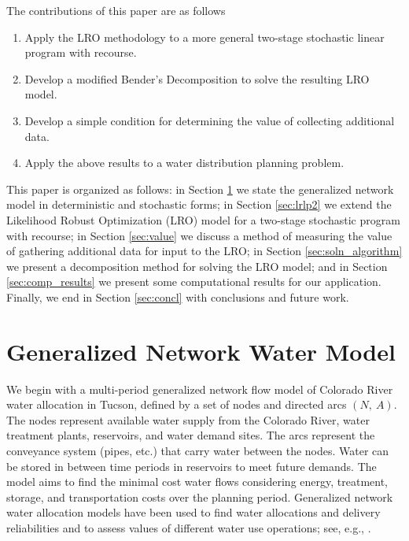 \documentclass[11pt]{article}
\begin{document}
The contributions of this paper are as follows
\begin{enumerate}
	\item Apply the LRO methodology to a more general two-stage stochastic linear program with recourse.
	\item Develop a modified Bender's Decomposition to solve the resulting LRO model.
	\item Develop a simple condition for determining the value of collecting additional data.
	\item Apply the above results to a water distribution planning problem.
\end{enumerate}

This paper is organized as follows: in Section \ref{sec:network_model} we state the generalized network model in deterministic and stochastic forms; in Section \ref{sec:lrlp2} we extend the Likelihood Robust Optimization (LRO) model for a two-stage stochastic program with recourse; in Section \ref{sec:value} we discuss a method of measuring the value of gathering additional data for input to the LRO; in Section \ref{sec:soln_algorithm} we present a decomposition method for solving the LRO model; and in Section \ref{sec:comp_results} we present some computational results for our application. Finally, we end in Section \ref{sec:concl} with conclusions and future work.


\section{Generalized Network Water Model} 
\label{sec:network_model}

We begin with a multi-period generalized network flow model of Colorado River water allocation in Tucson, defined by a set of nodes and directed arcs $(N,\: A)$.
The nodes represent available water supply from the Colorado River, water treatment plants, reservoirs, and water demand sites.
The arcs represent the conveyance system (pipes, etc.) that carry water between the nodes. 
Water can be stored in between time periods in reservoirs to meet future demands. 
The model aims to find the minimal cost water flows considering energy, treatment, storage, and transportation costs over the planning period. 
Generalized network water allocation models have been used to find water allocations and delivery reliabilities and to assess values of different water use operations; see, e.g., \cite{draper_etal_03}. 
\end{document}
